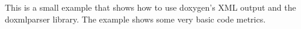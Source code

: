 This is a small example that shows how to use doxygen's X\-M\-L output and the doxmlparser library. The example shows some very basic code metrics. 